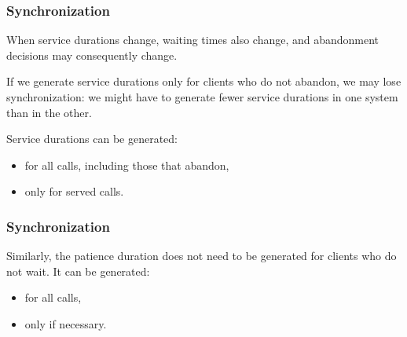 \documentclass[t,usepdftitle=false,aspectratio=169]{beamer}
\begin{document}
\begin{frame}
	\frametitle{Synchronization}
	
	When service durations change, waiting times also change,
	and abandonment decisions may consequently change.
	
	\mbox{}
	
	If we generate service durations only for clients who do not abandon, we may lose synchronization:
	we might have to generate fewer service durations in one system than in the other.
	
	\mbox{}
	
	Service durations can be generated:
	\begin{itemize}
		\item[(a)] 
		for all calls, including those that abandon,
		\item[(b)] 
		only for served calls.
	\end{itemize}
	
\end{frame}

\begin{frame}
	\frametitle{Synchronization}
	
	Similarly, the patience duration does not need to be generated for 
	clients who do not wait. It can be generated:
	\begin{itemize}
		\item[(c)] 
		for all calls,
		\item[(d)] 
		only if necessary.
	\end{itemize}
	
\end{frame}
\end{document}

